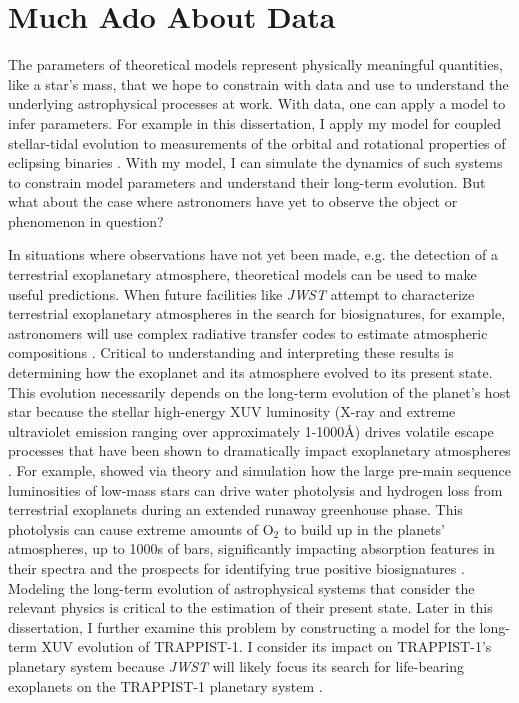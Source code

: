 \section{Much Ado About Data}

The parameters of theoretical models represent physically meaningful quantities, like a star's mass, that we hope to constrain with data and use to understand the underlying astrophysical processes at work. With data, one can apply a model to infer parameters. For example in this dissertation, I apply my model for coupled stellar-tidal evolution to measurements of the orbital and rotational properties of \kepler eclipsing binaries \citep[e.g.][]{McQuillan2014,Lurie2017}. With my model, I can simulate the dynamics of such systems to constrain model parameters and understand their long-term evolution. But what about the case where astronomers have yet to observe the object or phenomenon in question?

In situations where observations have not yet been made, e.g. the detection of a terrestrial exoplanetary atmosphere, theoretical models can be used to make useful predictions.  When future facilities like \textit{JWST} attempt to characterize terrestrial exoplanetary atmospheres in the search for biosignatures, for example, astronomers will use complex radiative transfer codes to estimate atmospheric compositions \citep[e.g. SMART,][]{Meadows1996,Crisp1997}. Critical to understanding and interpreting these results is determining how the exoplanet and its atmosphere evolved to its present state. This evolution necessarily depends on the long-term evolution of the planet's host star because the stellar high-energy XUV luminosity (X-ray and extreme ultraviolet emission ranging over approximately 1-1000\AA) drives volatile escape processes that have been shown to dramatically impact exoplanetary atmospheres \citep{Watson1981,Lammer2003,MurrayClay2009}. For example, \citet{Luger2015} showed via theory and simulation how the large pre-main sequence luminosities of low-mass stars can drive water photolysis and hydrogen loss from terrestrial exoplanets during an extended runaway greenhouse phase. This photolysis can cause extreme amounts of O$_2$ to build up in the planets' atmospheres, up to 1000s of bars, significantly impacting absorption features in their spectra and the prospects for identifying true positive biosignatures \citep[see][]{Meadows2017,Meadows2018}. Modeling the long-term evolution of astrophysical systems that consider the relevant physics is critical to the estimation of their present state. Later in this dissertation, I further examine this problem by constructing a model for the long-term XUV evolution of TRAPPIST-1. I consider its impact on TRAPPIST-1's planetary system because \textit{JWST} will likely focus its search for life-bearing exoplanets on the TRAPPIST-1 planetary system \citep{Morley2017,Lincowski2018,Lustig2019}. 

